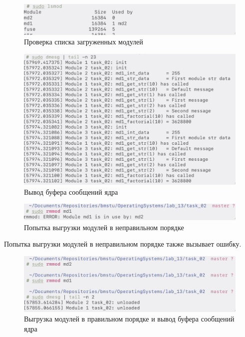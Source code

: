 \begin{figure}[H]
    \centering
    \caption{Проверка списка загруженных модулей}
    \includegraphics[scale=0.4]{images/scr_14.png}
\end{figure}
\begin{figure}[H]
    \centering
    \caption{Вывод буфера сообщений ядра}
    \includegraphics[scale=0.4]{images/scr_15.png}
\end{figure}
\begin{figure}[H]
    \centering
    \caption{Попытка выгрузки модулей в неправильном порядке}
    \includegraphics[scale=0.4]{images/scr_16.png}
\end{figure}

Попытка выгрузки модулей в неправильном порядке также вызывает ошибку.

\begin{figure}[H]
    \centering
    \caption{Выгрузка модулей в правильном порядке и вывод буфера сообщений ядра}
    \includegraphics[scale=0.4]{images/scr_17.png}
\end{figure}
